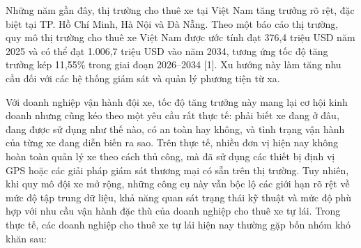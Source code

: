 \documentclass[a4paper]{extarticle}
\begin{document}
Những năm gần đây, thị trường cho thuê xe tại Việt Nam tăng
trưởng rõ rệt, đặc biệt tại TP. Hồ Chí Minh, Hà Nội và Đà Nẵng. Theo một
báo cáo thị trường, quy mô thị trường cho thuê xe Việt Nam được ước tính
đạt 376,4 triệu USD năm 2025 và có thể đạt 1.006,7 triệu USD vào năm
2034, tương ứng tốc độ tăng trưởng kép 11,55\% trong giai đoạn 2026--2034
{[}1{]}. Xu hướng này làm tăng nhu cầu đối với các hệ thống giám sát và
quản lý phương tiện từ xa.

Với doanh nghiệp vận hành đội xe, tốc độ tăng trưởng này mang lại cơ hội
kinh doanh nhưng cũng kéo theo một yêu cầu rất thực tế: phải biết xe
đang ở đâu, đang được sử dụng như thế nào, có an toàn hay không, và tình
trạng vận hành của từng xe đang diễn biến ra sao. Trên thực tế, nhiều
đơn vị hiện nay không hoàn toàn quản lý xe theo cách thủ công, mà đã sử
dụng các thiết bị định vị GPS hoặc các giải pháp giám sát thương mại có
sẵn trên thị trường. Tuy nhiên, khi quy mô đội xe mở rộng, những công cụ
này vẫn bộc lộ các giới hạn rõ rệt về mức độ tập trung dữ liệu, khả năng
quan sát trạng thái kỹ thuật và mức độ phù hợp với nhu cầu vận hành đặc
thù của doanh nghiệp cho thuê xe tự lái. Trong thực tế, các doanh
nghiệp cho thuê xe tự lái hiện nay thường gặp bốn nhóm khó khăn sau:
\end{document}
